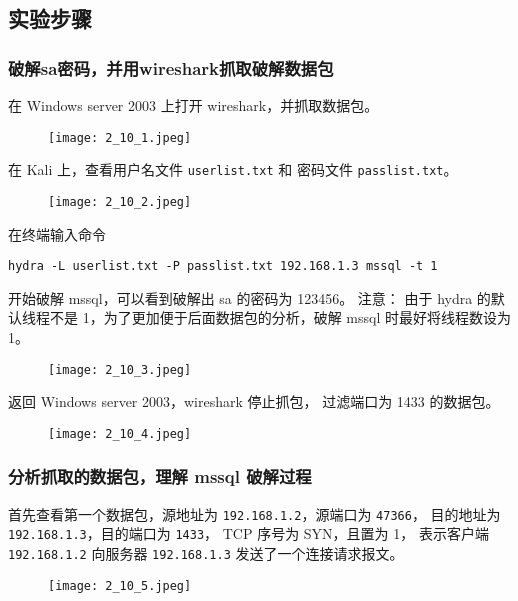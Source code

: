 \subsection{实验步骤}
\subsubsection{破解sa密码，并用wireshark抓取破解数据包}
在 Windows server 2003 上打开 wireshark，并抓取数据包。
\begin{figure}[H]
  \begin{center}
    \texttt{[image: 2\_10\_1.jpeg]}
  \end{center}
\end{figure}

在 Kali 上，查看用户名文件 \texttt{userlist.txt} 和
密码文件 \texttt{passlist.txt}。
\begin{figure}[H]
  \begin{center}
    \texttt{[image: 2\_10\_2.jpeg]}
  \end{center}
\end{figure}

在终端输入命令
\begin{verbatim}
hydra -L userlist.txt -P passlist.txt 192.168.1.3 mssql -t 1
\end{verbatim}
开始破解 mssql，可以看到破解出 sa 的密码为 123456。
注意：
由于 hydra 的默认线程不是 1，为了更加便于后面数据包的分析，破解 mssql
时最好将线程数设为 1。
\begin{figure}[H]
  \begin{center}
    \texttt{[image: 2\_10\_3.jpeg]}
  \end{center}
\end{figure}

返回 Windows server 2003，wireshark 停止抓包，
过滤端口为 1433 的数据包。
\begin{figure}[H]
  \begin{center}
    \texttt{[image: 2\_10\_4.jpeg]}
  \end{center}
\end{figure}
%
\subsubsection{分析抓取的数据包，理解 mssql 破解过程}
首先查看第一个数据包，源地址为 \texttt{192.168.1.2}，源端口为 \texttt{47366}，
目的地址为 \texttt{192.168.1.3}，目的端口为 \texttt{1433}，
TCP 序号为 SYN，且置为 1，
表示客户端 \texttt{192.168.1.2} 向服务器 \texttt{192.168.1.3} 发送了一个连接请求报文。
\begin{figure}[H]
  \begin{center}
    \texttt{[image: 2\_10\_5.jpeg]}
  \end{center}
\end{figure}

